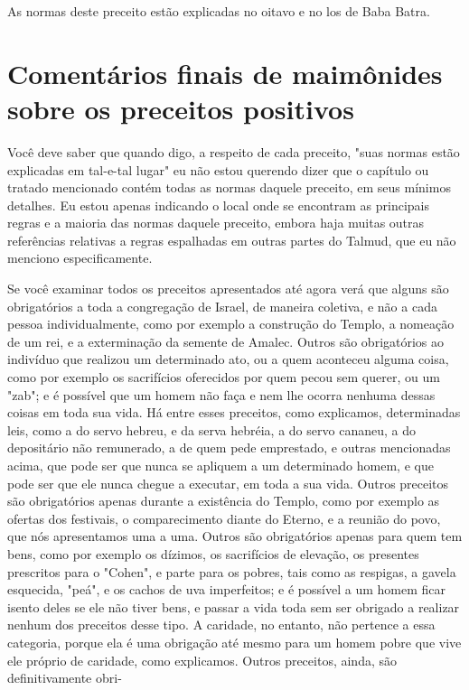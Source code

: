 \begin{itemize}
\begin{enumrate}
\begin{itemize}
\begin{itemize}
\begin{itemize}
As normas deste preceito estão explicadas no oitavo e no los de Baba
Batra.


\section{Comentários finais de maimônides sobre os preceitos positivos}


Você deve saber que quando digo, a respeito de cada preceito, "suas
normas estão explicadas em tal-e-tal lugar" eu não estou querendo dizer
que o capítulo ou tratado mencionado contém todas as normas daquele
preceito, em seus mínimos detalhes. Eu estou apenas indicando o local
onde se encon­tram as principais regras e a maioria das normas daquele
preceito, embora haja muitas outras referências relativas a regras
espalhadas em outras partes do Tal­mud, que eu não menciono
especificamente.

Se você examinar todos os preceitos apresentados até agora verá que
alguns são obrigatórios a toda a congregação de Israel, de maneira
coletiva, e não a cada pessoa individualmente, como por exemplo a
construção do Tem­plo, a nomeação de um rei, e a exterminação da semente
de Amalec. Outros são obrigatórios ao indivíduo que realizou um
determinado ato, ou a quem acon­teceu alguma coisa, como por exemplo os
sacrifícios oferecidos por quem pe­cou sem querer, ou um "zab"; e é
possível que um homem não faça e nem lhe ocorra nenhuma dessas coisas em
toda sua vida. Há entre esses preceitos, como explicamos, determinadas
leis, como a do servo hebreu, e da serva he­bréia, a do servo cananeu, a
do depositário não remunerado, a de quem pede emprestado, e outras
mencionadas acima, que pode ser que nunca se apliquem a um determinado
homem, e que pode ser que ele nunca chegue a executar, em toda a sua
vida. Outros preceitos são obrigatórios apenas durante a existên­cia do
Templo, como por exemplo as ofertas dos festivais, o comparecimento
diante do Eterno, e a reunião do povo, que nós apresentamos uma a uma.
Ou­tros são obrigatórios apenas para quem tem bens, como por exemplo os
dízi­mos, os sacrifícios de elevação, os presentes prescritos para o
"Cohen", e par­te para os pobres, tais como as respigas, a gavela
esquecida, "peá", e os cachos de uva imperfeitos; e é possível a um
homem ficar isento deles se ele não tiver bens, e passar a vida toda sem
ser obrigado a realizar nenhum dos preceitos desse tipo. A caridade, no
entanto, não pertence a essa categoria, porque ela é uma obrigação até
mesmo para um homem pobre que vive ele próprio de caridade, como
explicamos. Outros preceitos, ainda, são definitivamente obri-




\end{itemize}
\end{itemize}
\end{itemize}
\end{enumrate}
\end{itemize}
